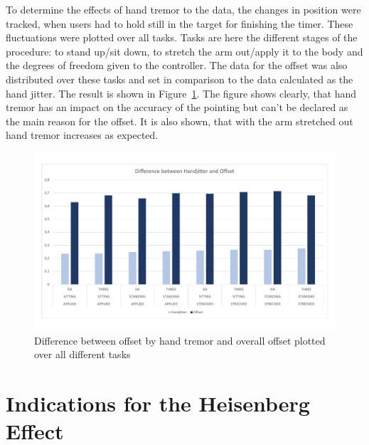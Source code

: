 To determine the effects of hand tremor to the data, the changes in position were tracked, when users had to hold still in the target for finishing the timer. These fluctuations were plotted over all tasks. Tasks are here the different stages of the procedure: to stand up/sit down, to stretch the arm out/apply it to the body and the degrees of freedom given to the controller. The data for the offset was also distributed over these tasks and set in comparison to the data calculated as the hand jitter. The result is shown in Figure~\ref{fig:difference_handjitter_offset}. The figure shows clearly, that hand tremor has an impact on the accuracy of the pointing but can't be declared as the main reason for the offset. It is also shown, that with the arm stretched out hand tremor increases as expected.  

\begin{figure}[h]
    \centering
    \includegraphics[width=.9\columnwidth]{graphics/graphs/difference_handjitter_offset.pdf}
    \caption{Difference between offset by hand tremor and overall offset plotted over all different tasks}
    \label{fig:difference_handjitter_offset}
\end{figure}

\section{Indications for the Heisenberg Effect}
\label{sec:evaluation:indications}

